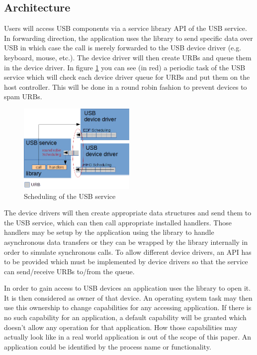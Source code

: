 \documentclass{acm_proc_article-sp}
\begin{document}
\subsection{Architecture}
Users will access USB components via a service library API of the USB service.
In forwarding direction, the application uses the library to send specific data
over USB in which case the call is merely forwarded to the USB device driver
(e.g. keyboard, mouse, etc.).
The device driver will then create URBs and queue them in the device driver.
In figure \ref{fig:usbsched} you can see (in red) a periodic task of the USB service
which will check each device driver queue for URBs and put them on the host controller.
This will be done in a round robin fashion to prevent devices to spam URBs.
\begin{figure}
\centering
\includegraphics[width=0.5\textwidth]{usbsched.png}
\caption{Scheduling of the USB service}
\label{fig:usbsched}
\end{figure}
The device drivers will then create appropriate data structures and send them
to the USB service, which can then call appropriate installed handlers.
Those handlers may be setup by the application using the library to handle
asynchronous data transfers or they can be wrapped by the library internally
in order to simulate synchronous calls.
To allow different device drivers, an API has to be provided which must be implemented
by device drivers so that the service can send/receive URBs to/from the queue.

In order to gain access to USB devices an application uses the library
to open it.
It is then considered as owner of that device.
An operating system task may then use this ownership to change capabilities
for any accessing application.
If there is no such capability for an application, a default capability will
be granted which doesn't allow any operation for that application.
How those capabilities may actually look like in a real world application
is out of the scope of this paper.
An application could be identified by the process name or functionality.
\end{document}
